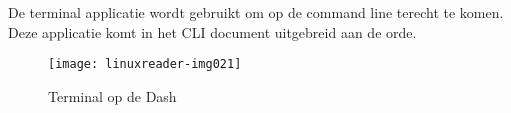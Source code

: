 De terminal applicatie wordt gebruikt om op de command line terecht te komen. Deze applicatie komt in het CLI document uitgebreid aan
de orde.

\begin{figure}
\texttt{[image: linuxreader-img021]}
\caption{Terminal op de Dash}
\end{figure}
